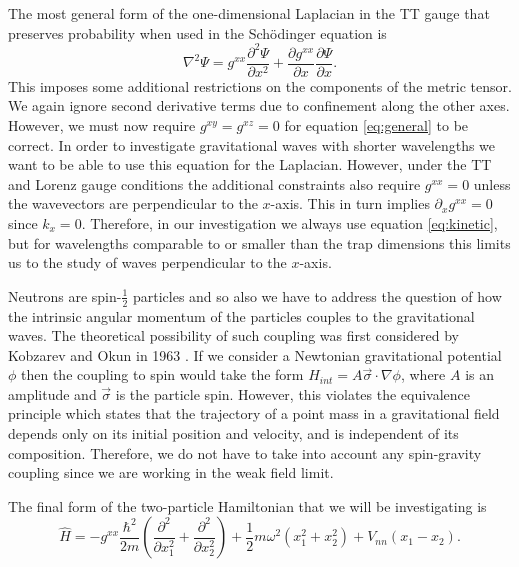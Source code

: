 The most general form of the one-dimensional Laplacian in the TT gauge
that preserves probability when used in the Sch\"{o}dinger equation is
\begin{equation}\label{eq:general}
\nabla^2 \Psi = g^{xx}\frac{\partial^2 \Psi}{\partial x^2} +
\frac{\partial g^{xx}}{\partial x} \frac{\partial \Psi}{\partial x}.
\end{equation}
This imposes some additional restrictions on the components of the
metric tensor. We again ignore second derivative terms due to
confinement along the other axes. However, we must now require $g^{xy}
= g^{xz} = 0$ for equation \eqref{eq:general} to be correct. In order
to investigate gravitational waves with shorter wavelengths we want to
be able to use this equation for the Laplacian. However, under the TT
and Lorenz gauge conditions the additional constraints also require
$g^{xx} = 0$ unless the wavevectors are perpendicular to the
$x$-axis. This in turn implies $\partial_x g^{xx} = 0$ since $k_x =
0$. Therefore, in our investigation we always use equation
\eqref{eq:kinetic}, but for wavelengths comparable to or smaller than
the trap dimensions this limits us to the study of waves perpendicular
to the $x$-axis.

Neutrons are spin-$\frac{1}{2}$ particles and so also we have to
address the question of how the intrinsic angular momentum of the
particles couples to the gravitational waves. The theoretical
possibility of such coupling was first considered by Kobzarev and Okun
in 1963 \cite{kobzarev}. If we consider a Newtonian gravitational
potential $\phi$ then the coupling to spin would take the form
$H_{int}=A\vec{\sigma}\cdot\nabla\phi$, where $A$ is an amplitude
and $\vec{\sigma}$ is the particle spin. However, this violates the
equivalence principle which states that the trajectory of a point mass
in a gravitational field depends only on its initial position and
velocity, and is independent of its composition. Therefore, we do not
have to take into account any spin-gravity coupling since we are
working in the weak field limit.

The final form of the two-particle Hamiltonian that we
will be investigating is
\begin{equation}\label{eq:main}
\hat{H} = - g^{xx} \frac{\hbar^2}{2m} \left(
  \frac{\partial^2}{\partial x_1^2} + \frac{\partial^2}{\partial
    x_2^2} \right) + \frac{1}{2}m\omega^2(x_1^2 + x_2^2) +
V_{nn}(x_1-x_2).
\end{equation}

